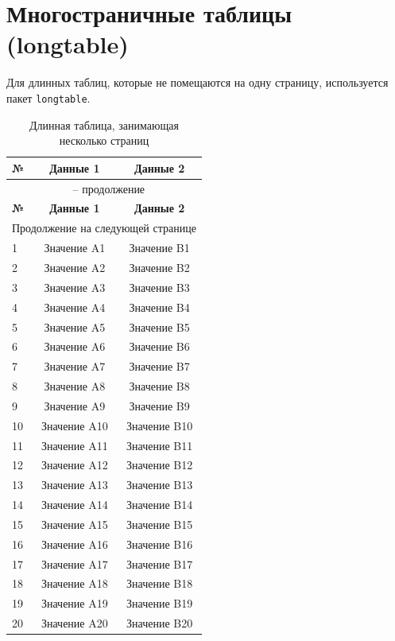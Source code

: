 \documentclass[a4paper,12pt]{article}
\begin{document}
\section{Многостраничные таблицы (longtable)}

Для длинных таблиц, которые не помещаются на одну страницу, используется пакет \texttt{longtable}.

\begin{longtable}{|l|c|c|}
  \caption{Длинная таблица, занимающая несколько страниц} \\
  \hline
  \textbf{№} & \textbf{Данные 1} & \textbf{Данные 2} \\
  \hline
  \endfirsthead
  
  \multicolumn{3}{c}{{\tablename\ \thetable{} -- продолжение}} \\
  \hline
  \textbf{№} & \textbf{Данные 1} & \textbf{Данные 2} \\
  \hline
  \endhead
  
  \hline
  \multicolumn{3}{r}{{Продолжение на следующей странице}} \\
  \endfoot
  
  \hline
  \endlastfoot
  
  1 & Значение A1 & Значение B1 \\
  2 & Значение A2 & Значение B2 \\
  3 & Значение A3 & Значение B3 \\
  4 & Значение A4 & Значение B4 \\
  5 & Значение A5 & Значение B5 \\
  6 & Значение A6 & Значение B6 \\
  7 & Значение A7 & Значение B7 \\
  8 & Значение A8 & Значение B8 \\
  9 & Значение A9 & Значение B9 \\
  10 & Значение A10 & Значение B10 \\
  11 & Значение A11 & Значение B11 \\
  12 & Значение A12 & Значение B12 \\
  13 & Значение A13 & Значение B13 \\
  14 & Значение A14 & Значение B14 \\
  15 & Значение A15 & Значение B15 \\
  16 & Значение A16 & Значение B16 \\
  17 & Значение A17 & Значение B17 \\
  18 & Значение A18 & Значение B18 \\
  19 & Значение A19 & Значение B19 \\
  20 & Значение A20 & Значение B20 \\
\end{longtable}
\end{document}
